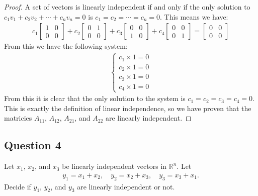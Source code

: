 \documentclass{article}
\begin{document}
\begin{proof}
A set of vectors is linearly independent if and only if 
the only solution to $c_{1}v_{1} + c_{2}v_{2} + \cdots + c_{n}v_{n} = 0$ is $c_{1} = c_{2} = \cdots = c_{n} = 0$.
This means we have:
\begin{align*}
c_{1}\begin{bmatrix} 1 & 0 \\ 0 & 0 \end{bmatrix} +
c_{2}\begin{bmatrix} 0 & 1 \\ 0 & 0 \end{bmatrix} +
c_{3}\begin{bmatrix} 0 & 0 \\ 1 & 0 \end{bmatrix} +
c_{4}\begin{bmatrix} 0 & 0 \\ 0 & 1 \end{bmatrix} =
\begin{bmatrix} 0 & 0 \\ 0 & 0 \end{bmatrix}
\end{align*}
From this we have the following system:
\begin{align*}
\begin{cases} c_{1} \times 1 = 0 \\ c_{2} \times 1 = 0 \\ c_{3} \times 1 = 0 \\ c_{4} \times 1 = 0 \end{cases}
\end{align*}
From this it is clear that the only solution to the system is $c_{1} = c_{2} = c_{3} = c_{4} = 0$.
This is exactly the definition of linear independence, so we have proven that the matricies $A_{11}$, $A_{12}$, $A_{21}$, and $A_{22}$ are linearly independent.
\end{proof}

\newpage
\subsection*{Question 4}
Let \(x_{1}\), \(x_{2}\), and \(x_{3}\) be linearly independent vectors in \(\mathbb{R}^{n}\). Let
\begin{align*}
y_{1} = x_{1} + x_{2}, \quad y_{2} = x_{2} + x_{3}, \quad y_{3} = x_{3} + x_{1}.
\end{align*}
Decide if \(y_{1}\), \(y_{2}\), and \(y_{3}\) are linearly independent or not.
\end{document}

